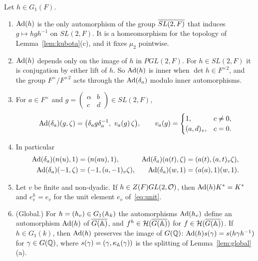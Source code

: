 \begin{lemma}\label{lem:Ad}
Let $h\in G_1(F)$.
\begin{enumerate}[label=(\alph*)]
\item $\operatorname{Ad}(h)$ is the only automorphism of the group $\overline{SL(2,F)}$ that
  induces $g\mapsto hgh^{-1}$ on $SL(2,F)$. It is a homeomorphism for
  the topology of Lemma~\ref{lem:kubota}(c), and it fixes $\mu_2$
  pointwise.
\item $\operatorname{Ad}(h)$ depends only on the image of $h$ in $PGL(2,F)$.
  For $h\in SL(2,F)$ it is conjugation by either lift of $h$. So
  $\operatorname{Ad}(h)$ is inner when $\det h\in F^{\times2}$, and the group
  $F^\times/F^{\times2}$ acts through the $\operatorname{Ad}(\delta_a)$ modulo
  inner automorphisms.
\item For $a\in F^\times$ and $g=\begin{pmatrix}\alpha&b\\c&d
  \end{pmatrix}\in SL(2,F)$,
  \begin{equation}\label{eq:Ad-delta}
  \operatorname{Ad}(\delta_a)(g,\zeta)=\bigl(\delta_ag\delta_a^{-1},\ v_a(g)\,
  \zeta\bigr),\qquad v_a(g)=\begin{cases}1,&c\ne0,\\(a,d)_v,&c=0.
  \end{cases}
  \end{equation}
\item In particular
  \begin{align*}
  \operatorname{Ad}(\delta_a)(n(u),1)&=(n(au),1),&
  \operatorname{Ad}(\delta_a)(a(t),\zeta)&=(a(t),(a,t)_v\zeta),\\
  \operatorname{Ad}(\delta_a)(-1,\zeta)&=(-1,(a,-1)_v\zeta),&
  \operatorname{Ad}(\delta_a)(w,1)&=(a(a),1)(w,1).
  \end{align*}
\item Let $v$ be finite and non-dyadic. If $h\in Z(F)GL(2,\mathcal{O})$, then
  $\operatorname{Ad}(h)K^*=K^*$ and $e_v^h=e_v$ for the unit element $e_v$
  of~\eqref{eq:unit}.
\item (Global.) For $h=(h_v)\in G_1(\mathbb{A}_k)$ the automorphisms
  $\operatorname{Ad}(h_v)$ define an automorphism $\operatorname{Ad}(h)$ of $\overline{G(\mathbb{A})}$,
  and $f^h\in\mathcal H(\overline{G(\mathbb{A})})$ for $f\in\mathcal H(\overline{G(\mathbb{A})})$. If
  $h\in G_1(k)$, then $\operatorname{Ad}(h)$ preserves the image of $G(\mathbb{Q})$:
  $\operatorname{Ad}(h)s(\gamma)=s(h\gamma h^{-1})$ for $\gamma\in G(\mathbb{Q})$, where
  $s(\gamma)=(\gamma,\kappa_{\mathbb{A}}(\gamma))$ is the splitting of
  Lemma~\ref{lem:global}(a).
\end{enumerate}
\end{lemma}

